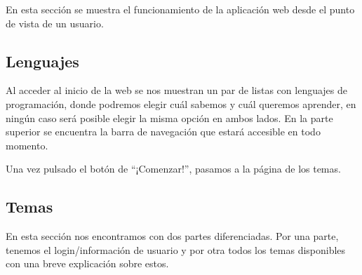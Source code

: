 
En esta sección se muestra el funcionamiento de la aplicación web desde el punto de vista de un usuario.

\subsection{Lenguajes}
Al acceder al inicio de la web se nos muestran un par de listas con lenguajes de programación, donde podremos elegir cuál sabemos y cuál queremos aprender, en ningún caso será posible elegir la misma opción en ambos lados. En la parte superior se encuentra la barra de navegación que estará accesible en todo momento.

\begin{figure}[H]
\begin{center}
\end{center}
\end{figure}

Una vez pulsado el botón de ``¡Comenzar!'', pasamos a la página de los temas.

\subsection{Temas}
En esta sección nos encontramos con dos partes diferenciadas. Por una parte, tenemos el login/información de usuario y por otra todos los temas disponibles con una breve explicación sobre estos.

\begin{figure}[H]
\begin{center}
\end{center}
\end{figure}

